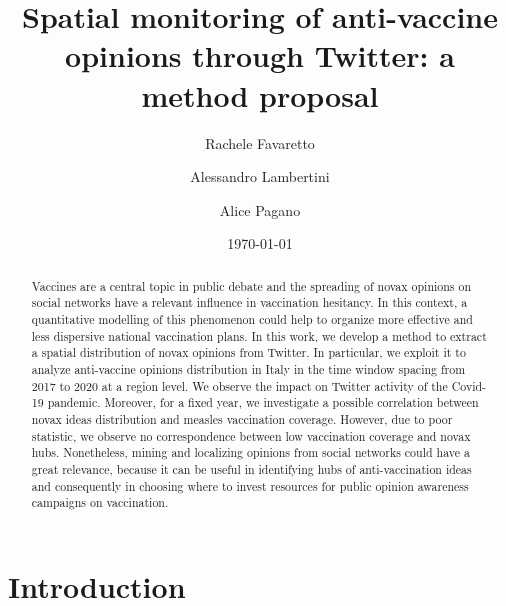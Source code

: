 \documentclass[prb,twocolumn,9pt]{revtex4-1}
\begin{document}

\title{Spatial monitoring of anti-vaccine opinions through Twitter: a method proposal}



\author{Rachele Favaretto}
\author{Alessandro Lambertini}
\author{Alice Pagano}

\date{\today}

\begin{abstract}

Vaccines are a central topic in public debate and the spreading of novax opinions on social networks have a relevant influence in vaccination hesitancy. 
In this context, a quantitative modelling of this phenomenon could help to organize more effective and less dispersive national vaccination plans.
In this work, we develop a method to extract a spatial distribution of novax opinions from Twitter. In particular, we exploit it to analyze anti-vaccine opinions distribution in Italy in the time window spacing from 2017 to 2020 at a region level. 
We observe the impact on Twitter activity of the Covid-19 pandemic.
Moreover, for a fixed year, we investigate a possible correlation between novax ideas distribution and measles vaccination coverage. However, due to poor statistic, we observe no correspondence between low vaccination coverage and novax hubs. 
Nonetheless, mining and localizing opinions from social networks could have a great relevance, because it can be useful in identifying hubs of anti-vaccination ideas and consequently in choosing where to invest resources for public opinion awareness campaigns on vaccination.

\end{abstract}


\maketitle



\section{Introduction}
\label{sec:introduction}
\end{document}
